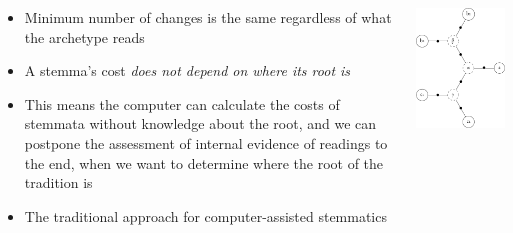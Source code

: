 \documentclass[10pt]{beamer}
\begin{document}
	\begin{frame}
		\begin{columns}[T]
			\begin{column}{0.45\textwidth}
				\begin{itemize}
					\item Minimum number of changes is the same regardless of what the archetype reads
					\item A stemma's cost \emph{does not depend on where its root is}
					\item This means the computer can calculate the costs of stemmata without knowledge about the root, and we can postpone the assessment of internal evidence of readings to the end, when we want to determine where the root of the tradition is
					\item The traditional approach for computer-assisted stemmatics
				\end{itemize}
			\end{column}
			\begin{column}{0.5\textwidth}
				\includegraphics[scale=1]{../img/stemma-unrooted-potential-roots.pdf}
			\end{column}
		\end{columns}
	\end{frame}
\end{document}
